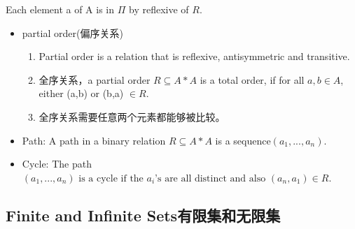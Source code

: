 \documentclass[UTF8]{ctexart}
\begin{document}
Each element a of A is in $\varPi$ by reflexive of $R$.

\begin{itemize}
    \item partial order(偏序关系)
    
    \begin{enumerate}
        \item Partial order is a relation that is reflexive, antisymmetric and transitive.
        \item 全序关系，a partial order $R \subseteq A*A$ is a total order, if for all $a,b \in A$, either (a,b) or (b,a) $\in R$.
        \item 全序关系需要任意两个元素都能够被比较。
    \end{enumerate}

    \item Path: A path in a binary relation $R \subseteq A*A$ is a sequence$(a_1,...,a_n)$.
    \item Cycle: The path $(a_1, ... , a_n) \text{ is a cycle if the } a_i \text{'s are all distinct and also } (a_n, a_1) \in R.$

\end{itemize}

\subsection{Finite and Infinite Sets有限集和无限集}
\end{document}

